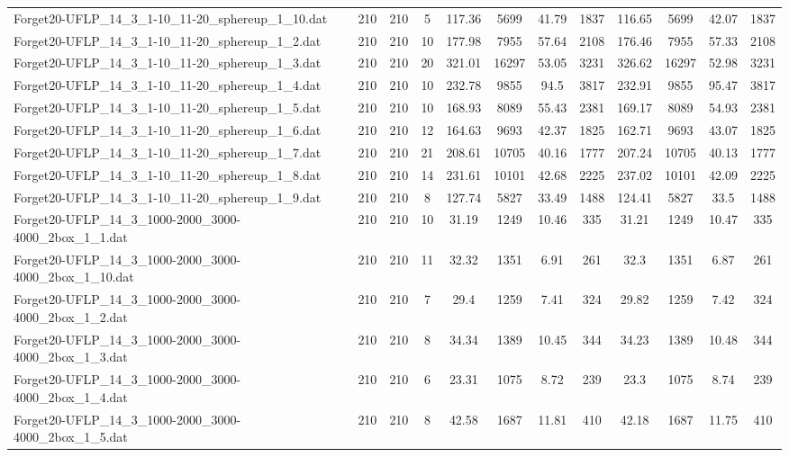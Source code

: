 \begin{sidewaystable}[!ht]
{\begin{tabular}{lccccccccccc}
Forget20-UFLP\_14\_3\_1-10\_11-20\_sphereup\_1\_10.dat & 210 & 210 & 5 & 117.36 & 5699 & 41.79 & 1837 & 116.65 & 5699 & 42.07 & 1837 \\
Forget20-UFLP\_14\_3\_1-10\_11-20\_sphereup\_1\_2.dat & 210 & 210 & 10 & 177.98 & 7955 & 57.64 & 2108 & 176.46 & 7955 & 57.33 & 2108 \\
Forget20-UFLP\_14\_3\_1-10\_11-20\_sphereup\_1\_3.dat & 210 & 210 & 20 & 321.01 & 16297 & 53.05 & 3231 & 326.62 & 16297 & 52.98 & 3231 \\
Forget20-UFLP\_14\_3\_1-10\_11-20\_sphereup\_1\_4.dat & 210 & 210 & 10 & 232.78 & 9855 & 94.5 & 3817 & 232.91 & 9855 & 95.47 & 3817 \\
Forget20-UFLP\_14\_3\_1-10\_11-20\_sphereup\_1\_5.dat & 210 & 210 & 10 & 168.93 & 8089 & 55.43 & 2381 & 169.17 & 8089 & 54.93 & 2381 \\
Forget20-UFLP\_14\_3\_1-10\_11-20\_sphereup\_1\_6.dat & 210 & 210 & 12 & 164.63 & 9693 & 42.37 & 1825 & 162.71 & 9693 & 43.07 & 1825 \\
Forget20-UFLP\_14\_3\_1-10\_11-20\_sphereup\_1\_7.dat & 210 & 210 & 21 & 208.61 & 10705 & 40.16 & 1777 & 207.24 & 10705 & 40.13 & 1777 \\
Forget20-UFLP\_14\_3\_1-10\_11-20\_sphereup\_1\_8.dat & 210 & 210 & 14 & 231.61 & 10101 & 42.68 & 2225 & 237.02 & 10101 &  \textcolor{blue2}{42.09} & 2225 \\
Forget20-UFLP\_14\_3\_1-10\_11-20\_sphereup\_1\_9.dat & 210 & 210 & 8 & 127.74 & 5827 & 33.49 & 1488 & 124.41 & 5827 & 33.5 & 1488 \\
Forget20-UFLP\_14\_3\_1000-2000\_3000-4000\_2box\_1\_1.dat & 210 & 210 & 10 & 31.19 & 1249 &  \textcolor{blue2}{10.46} & 335 & 31.21 & 1249 & 10.47 & 335 \\
Forget20-UFLP\_14\_3\_1000-2000\_3000-4000\_2box\_1\_10.dat & 210 & 210 & 11 & 32.32 & 1351 & 6.91 & 261 & 32.3 & 1351 &  \textcolor{blue2}{6.87} & 261 \\
Forget20-UFLP\_14\_3\_1000-2000\_3000-4000\_2box\_1\_2.dat & 210 & 210 & 7 & 29.4 & 1259 &  \textcolor{blue2}{7.41} & 324 & 29.82 & 1259 & 7.42 & 324 \\
Forget20-UFLP\_14\_3\_1000-2000\_3000-4000\_2box\_1\_3.dat & 210 & 210 & 8 & 34.34 & 1389 &  \textcolor{blue2}{10.45} & 344 & 34.23 & 1389 & 10.48 & 344 \\
Forget20-UFLP\_14\_3\_1000-2000\_3000-4000\_2box\_1\_4.dat & 210 & 210 & 6 & 23.31 & 1075 &  \textcolor{blue2}{8.72} & 239 & 23.3 & 1075 & 8.74 & 239 \\
Forget20-UFLP\_14\_3\_1000-2000\_3000-4000\_2box\_1\_5.dat & 210 & 210 & 8 & 42.58 & 1687 & 11.81 & 410 & 42.18 & 1687 &  \textcolor{blue2}{11.75} & 410 \\

\end{tabular}}
\end{sidewaystable}
